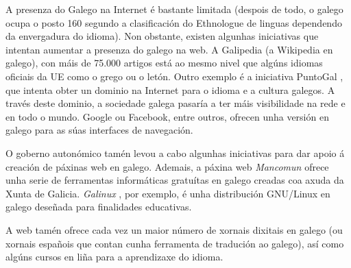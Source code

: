\begin{multicols}{2}
    A presenza do Galego na Internet é bastante limitada (despois de todo, o galego ocupa o posto 160 segundo a clasificación do Ethnologue \cite{GAL-Nota16} de linguas dependendo da envergadura do idioma). Non obstante, existen algunhas iniciativas que intentan aumentar a presenza do galego na web. A Galipedia \cite{GAL-Nota17} (a Wikipedia en galego), con máis de 75.000 artigos está ao mesmo nivel que algúns idiomas oficiais da UE como o grego ou o letón. Outro exemplo é a iniciativa PuntoGal \cite{GAL-Nota18}, que intenta obter un dominio na Internet para o idioma e a cultura galegos. A través deste dominio, a sociedade galega pasaría a ter máis visibilidade na rede e en todo o mundo. Google ou Facebook, entre outros, ofrecen unha versión en galego para as súas interfaces de navegación.

O goberno autonómico tamén levou a cabo algunhas iniciativas para dar apoio á creación de páxinas web en galego. Ademais, a páxina web \textit{Mancomun} \cite{GAL-Nota19} ofrece unha serie de ferramentas informáticas gratuítas en galego creadas coa axuda da Xunta de Galicia. \textit{Galinux} \cite{GAL-Nota20}, por exemplo, é unha distribución GNU/Linux en galego deseñada para finalidades educativas.

A web tamén ofrece cada vez un maior número de xornais dixitais en galego (ou xornais españois que contan cunha ferramenta de tradución ao galego), así como algúns cursos en liña para a aprendizaxe do idioma. 

\end{multicols}

\clearpage



